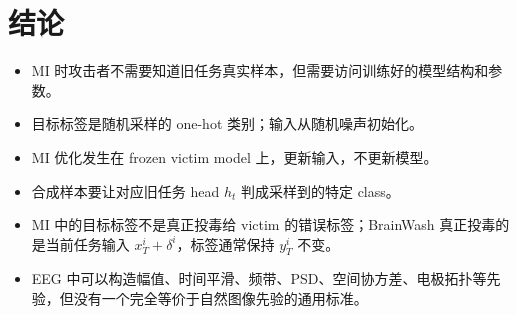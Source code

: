 \documentclass[11pt]{article}
\begin{document}
\section{结论}

\begin{itemize}
  \item MI 时攻击者不需要知道旧任务真实样本，但需要访问训练好的模型结构和参数。
  \item 目标标签是随机采样的 one-hot 类别；输入从随机噪声初始化。
  \item MI 优化发生在 frozen victim model 上，更新输入，不更新模型。
  \item 合成样本要让对应旧任务 head \(h_t\) 判成采样到的特定 class。
  \item MI 中的目标标签不是真正投毒给 victim 的错误标签；BrainWash 真正投毒的是当前任务输入 \(x_T^i+\delta^i\)，标签通常保持 \(y_T^i\) 不变。
  \item EEG 中可以构造幅值、时间平滑、频带、PSD、空间协方差、电极拓扑等先验，但没有一个完全等价于自然图像先验的通用标准。
\end{itemize}
\end{document}
